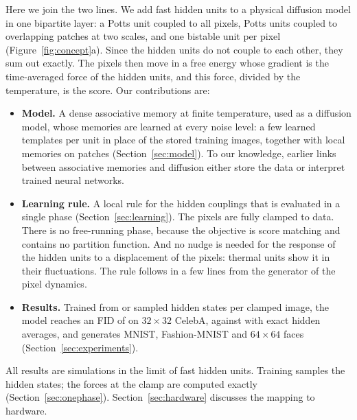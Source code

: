 \documentclass{article}
\newif\ifshownotes
\newcommand{\todo}[1]{\ifshownotes\textcolor{tbdcolor}{[TODO: #1]}\fi}
\begin{document}
Here we join the two lines. We add fast hidden units to a physical diffusion
model in one bipartite layer: a Potts unit coupled to all pixels, Potts units
coupled to overlapping patches at two scales, and one bistable unit per pixel
(Figure~\ref{fig:concept}a). Since the hidden units do not couple to each
other, they sum out exactly. The pixels then move in a free energy whose
gradient is the time-averaged force of the hidden units, and this force,
divided by the temperature, is the score. Our contributions are:
\begin{itemize}[leftmargin=1.3em,itemsep=1pt,topsep=2pt,parsep=0pt]
  \item \textbf{Model.} A dense associative memory at finite temperature, used
        as a diffusion model, whose memories are learned at every noise level:
        a few learned templates per unit in place of the stored training
        images, together with
        local memories on patches (Section~\ref{sec:model}). To our knowledge,
        earlier links between associative memories and diffusion either store
        the data or interpret trained neural networks.
  \item \textbf{Learning rule.} A local rule for the hidden couplings that is
        evaluated in a single phase (Section~\ref{sec:learning}). The pixels
        are fully clamped to data. There is no free-running phase, because the
        objective is score matching and contains no partition function. And no
        nudge is needed for the response of the hidden units to a displacement
        of the pixels: thermal units show it in their fluctuations.
        The rule follows in a few lines from the generator of the
        pixel dynamics.
  \item \textbf{Results.} Trained from \Slarge{} or \Ssmall{} sampled hidden
        states per clamped image, the model reaches an FID of
        \FIDcelebLowSlarge{} on $32\times32$ CelebA, against
        \FIDcelebLowExact{} with exact hidden averages, and generates MNIST,
        Fashion-MNIST and $64\times64$ faces
        (Section~\ref{sec:experiments}).
        \todo{state quality against the floor of real images at the same
        sample count, not as a ranking against FIDs reported in other
        papers.}
\end{itemize}
All results are simulations in the limit of fast hidden units. Training
samples the hidden states; the forces at the clamp are computed exactly
(Section~\ref{sec:onephase}). Section~\ref{sec:hardware} discusses the mapping
to hardware.
\end{document}
